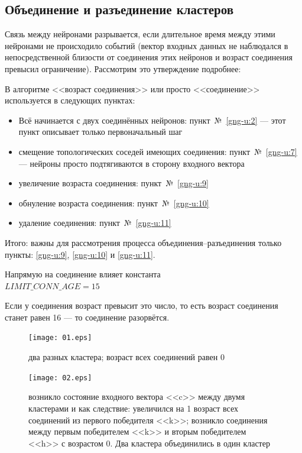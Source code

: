 \documentclass[unicode, 12pt, a4paper,oneside,fleqn]{article}
\begin{document}
\subsection{Объединение и разъединение кластеров}
Связь между нейронами разрывается, если длительное время между этими
нейронами не происходило событий (вектор входных данных не наблюдался
в непосредственной близости от соединения этих нейронов и возраст
соединения превысил ограничение). Рассмотрим это утверждение
подробнее:

В алгоритме <<возраст соединения>> или просто <<соединение>>
используется в следующих пунктах:
\begin{itemize}
\item Всё начинается с двух соединённых нейронов: пункт~№~\ref{gng-u:2} ---
  этот пункт описывает только первоначальный шаг
\item смещение топологических соседей имеющих соединения: пункт~№~\ref{gng-u:7}
  --- нейроны просто подтягиваются в сторону входного вектора
\item увеличение возраста соединения: пункт~№~\ref{gng-u:9}
\item обнуление возраста соединения: пункт~№~\ref{gng-u:10}
\item удаление соединения: пункт~№~\ref{gng-u:11}
\end{itemize}
Итого: важны для рассмотрения процесса объединения--разъединения
только пункты: \ref{gng-u:9}, \ref{gng-u:10} и \ref{gng-u:11}.

Напрямую на соединение влияет константа\\
$LIMIT\_CONN\_AGE = 15$

Если у соединения возраст превысит это число, то есть возраст
соединения станет равен 16 --- то соединение разорвётся.

\begin{figure}[h]
  \center
  \texttt{[image: 01.eps]} %
  \caption{два разных кластера; возраст всех соединений равен 0}
  \label{conn-step:01}
\end{figure}

\begin{figure}[h]
  \center
  \texttt{[image: 02.eps]}
  \caption{возникло состояние входного вектора <<c>> между двумя
    кластерами и как следствие: увеличился на 1 возраст всех
    соединений из первого победителя <<k>>; возникло соединения между
    первым победителем <<k>> и вторым победителем <<h>> с возрастом
    0. Два кластера объединились в один кластер}
  \label{conn-step:02}
\end{figure}
\end{document}
